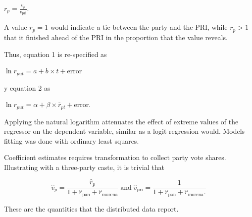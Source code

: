 \documentclass[letter,12pt]{article}
\begin{document}
$r_p = \frac{v_p}{v_{\text{pri}}}.$

A value $r_p=1$ would indicate a tie between the party and the PRI, while $r_p>1$ that it finished ahead of the PRI in the proportion that the value reveals. 

Thus, equation 1 is re-specified as

$\ln r_{put} = a + b \times t + \text{error}$

y equation 2 as

$\ln r_{put} = \alpha + \beta \times \bar{r}_{pt} + \text{error}.$

Applying the natural logarithm attenuates the effect of extreme values of the regressor on the dependent variable, similar as a logit regression would. Models fitting was done with ordinary least squares. 

Coefficient estimates requires transformation to collect party vote shares. Illustrating with a three-party caste, it is trivial that 

\begin{equation}
\hat{v}_p = \frac{\hat{r}_p}{1 + \hat{r}_{\text{pan}} + \hat{r}_{\text{morena}}} \; \text{and} \;
\hat{v}_{\text{pri}} = \frac{1}{1 + \hat{r}_{\text{pan}} + \hat{r}_{\text{morena}}.}
\end{equation}


These are the quantities that the distributed data report. 







\end{document}
